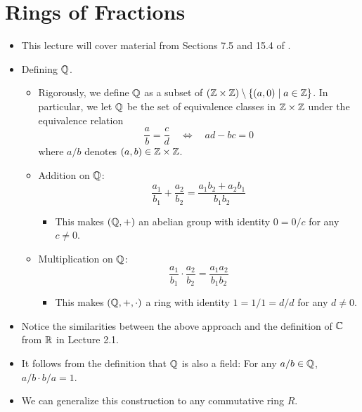 \documentclass[../notes.tex]{subfiles}
\begin{document}
\section{Rings of Fractions}
\begin{itemize}
    \item {}This lecture will cover material from Sections 7.5 and 15.4 of \textcite{bib:DummitFoote}.
    \item Defining $\mathbb{Q}$.
    \begin{itemize}
        \item Rigorously, we define $\mathbb{Q}$ as a subset of $(\mathbb{Z}\times\mathbb{Z})\setminus\{(a,0)\mid a\in\mathbb{Z}\}$. In particular, we let $\mathbb{Q}$ be the set of equivalence classes in $\mathbb{Z}\times\mathbb{Z}$ under the equivalence relation
        \begin{equation*}
            \frac{a}{b} = \frac{c}{d}
            \quad\Longleftrightarrow\quad
            ad-bc = 0
        \end{equation*}
        where $a/b$ denotes $(a,b)\in\mathbb{Z}\times\mathbb{Z}$.
        \item Addition on $\mathbb{Q}$:
        \begin{equation*}
            \frac{a_1}{b_1}+\frac{a_2}{b_2} = \frac{a_1b_2+a_2b_1}{b_1b_2}
        \end{equation*}
        \begin{itemize}
            \item This makes $(\mathbb{Q},+)$ an abelian group with identity $0=0/c$ for any $c\neq 0$.
        \end{itemize}
        \item Multiplication on $\mathbb{Q}$:
        \begin{equation*}
            \frac{a_1}{b_1}\cdot\frac{a_2}{b_2} = \frac{a_1a_2}{b_1b_2}
        \end{equation*}
        \begin{itemize}
            \item This makes $(\mathbb{Q},+,\cdot)$ a ring with identity $1=1/1=d/d$ for any $d\neq 0$.
        \end{itemize}
    \end{itemize}
    \item Notice the similarities between the above approach and the definition of $\mathbb{C}$ from $\mathbb{R}$ in Lecture 2.1.
    \item It follows from the definition that $\mathbb{Q}$ is also a field: For any $a/b\in\mathbb{Q}$, $a/b\cdot b/a=1$.
    \item We can generalize this construction to any commutative ring $R$.

\end{itemize}
\end{document}
